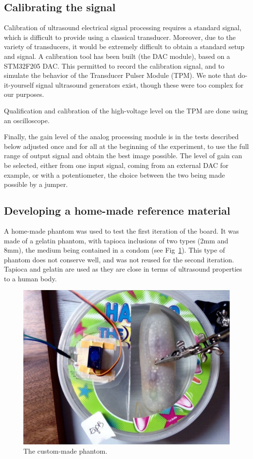 \documentclass[letterpaper, 10 pt, conference]{ieeeconf} %
\begin{document}
\subsection{Calibrating the signal}

Calibration of ultrasound electrical signal processing requires a standard signal, which is difficult to provide using a classical transducer. Moreover, due to the variety of transducers, it would be extremely difficult to obtain a standard setup and signal. A calibration tool has been built (the DAC module), based on a STM32F205 DAC. This permitted to record the calibration signal, and to simulate the behavior of the Transducer Pulser Module (TPM).  We note that do-it-yourself signal ultrasound generators \cite{c23} exist, though these were too complex for our purposes.

Qualification and calibration of the high-voltage level on the TPM are done using an oscilloscope.

Finally, the gain level of the analog processing module is in the tests described below adjusted once and for all at the beginning of the experiment, to use the full range of output signal and obtain the best image possible. The level of gain can be selected, either from one input signal, coming from an external DAC for example, or with a potentiometer, the choice between the two being made possible by a jumper.

\subsection{Developing a home-made reference material}

A home-made phantom was used to test the first iteration of the board. It was made of a gelatin phantom, with tapioca inclusions of two types (2mm and 8mm), the medium being contained in a condom (see Fig~\ref{fig:phantom}). This type of phantom does not conserve well, and was not reused for the second iteration. Tapioca and gelatin are used as they are close in terms of ultrasound properties to a human body.

\begin{figure}%
\centering
\includegraphics[width=.9\linewidth]{phantom}
\caption{The custom-made phantom.}
\label{fig:phantom}
\end{figure}
\end{document}

